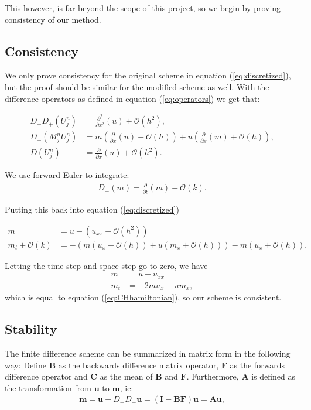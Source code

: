 This however, is far beyond the scope of this project, so we begin by proving consistency of our method.

\subsection*{Consistency}
We only prove consistency for the original scheme in equation (\ref{eq:discretized}), but the proof should be similar for the modified scheme as well. With the difference operators as defined in equation (\ref{eq:operators}) we get that:

\begin{align*}
D_- D_+ \left( U_j^n \right)  &= \frac{\partial^2}{\partial x^2} (u) + \mathcal{O} \left( h^ 2 \right), \\
 D_- \left(M_j^n U_j^n \right) &= m \left( \frac{\partial}{\partial x} (u) + \mathcal{O}(h) \right) + u \left( \frac{\partial}{\partial x} (m) + \mathcal{O} \left( h \right) \right),  \\
D \left(U_j^n \right) &= \frac{\partial}{\partial x} (u) + \mathcal{O} \left( h^2 \right).
\end{align*}

We use forward Euler to integrate:
\begin{align*}
D_+ (m) =  \frac{\partial}{\partial t} (m) + \mathcal{O}(k).
\end{align*}

Putting this back into equation (\ref{eq:discretized})

\begin{align*}
m &= u - \left( u_{xx} + \mathcal{O}\left(h^2\right) \right) \\
m_t  + \mathcal{O}(k) &= - \left( m \left( u_x + \mathcal{O}(h) \right) +  u \left( m_x + \mathcal{O}(h) \right)  \right) - m \left( u_x + \mathcal{O}(h) \right).
\end{align*}

Letting the time step and space step go to zero, we have
\begin{align*}
m &= u - u_{xx} \\
m_t &= - 2m u_x - u m_x,
\end{align*}
which is equal to equation (\ref{eq:CHhamiltonian}), so our scheme is consistent. 

\subsection*{Stability}
The finite difference scheme can be summarized in matrix form in the following way:
Define $\bm{B}$ as the backwards difference matrix operator, $\bm{F}$ as the forwards difference operator and $\bm{C}$ as the mean of $\bm{B}$ and $\bm{F}$. Furthermore, $\bm{A}$ is defined as the transformation from $\bm{u}$ to $\bm{m}$, ie:
\begin{align*}
\bm{m} = \bm{u}-D_-D_+\bm{u} = (\bm{I}-\bm{BF})\bm{u} = \bm{A} \bm{u},
\end{align*} 

